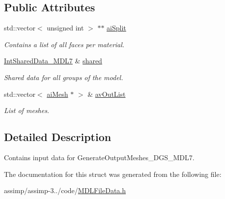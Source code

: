 \subsection*{Public Attributes}
\begin{DoxyCompactItemize}
\item 
\hypertarget{struct_assimp_1_1_m_d_l_1_1_int_split_group_data___m_d_l7_a9ffb10d3870a5d7408885b1e9b310814}{std\+::vector$<$ unsigned int $>$ $\ast$$\ast$ \hyperlink{struct_assimp_1_1_m_d_l_1_1_int_split_group_data___m_d_l7_a9ffb10d3870a5d7408885b1e9b310814}{ai\+Split}}\label{struct_assimp_1_1_m_d_l_1_1_int_split_group_data___m_d_l7_a9ffb10d3870a5d7408885b1e9b310814}

\begin{DoxyCompactList}\small\item\em Contains a list of all faces per material. \end{DoxyCompactList}\item 
\hypertarget{struct_assimp_1_1_m_d_l_1_1_int_split_group_data___m_d_l7_a4b0fd7c1a2246526ec255f5254c868e1}{\hyperlink{struct_assimp_1_1_m_d_l_1_1_int_shared_data___m_d_l7}{Int\+Shared\+Data\+\_\+\+M\+D\+L7} \& \hyperlink{struct_assimp_1_1_m_d_l_1_1_int_split_group_data___m_d_l7_a4b0fd7c1a2246526ec255f5254c868e1}{shared}}\label{struct_assimp_1_1_m_d_l_1_1_int_split_group_data___m_d_l7_a4b0fd7c1a2246526ec255f5254c868e1}

\begin{DoxyCompactList}\small\item\em Shared data for all groups of the model. \end{DoxyCompactList}\item 
\hypertarget{struct_assimp_1_1_m_d_l_1_1_int_split_group_data___m_d_l7_a724f4f4f679f6e9babe98142a6a06dcb}{std\+::vector$<$ \hyperlink{structai_mesh}{ai\+Mesh} $\ast$ $>$ \& \hyperlink{struct_assimp_1_1_m_d_l_1_1_int_split_group_data___m_d_l7_a724f4f4f679f6e9babe98142a6a06dcb}{av\+Out\+List}}\label{struct_assimp_1_1_m_d_l_1_1_int_split_group_data___m_d_l7_a724f4f4f679f6e9babe98142a6a06dcb}

\begin{DoxyCompactList}\small\item\em List of meshes. \end{DoxyCompactList}\end{DoxyCompactItemize}


\subsection{Detailed Description}
Contains input data for Generate\+Output\+Meshes\+\_\+D\+G\+S\+\_\+\+M\+D\+L7. 

The documentation for this struct was generated from the following file\+:\begin{DoxyCompactItemize}
\item 
assimp/assimp-\/3../code/\hyperlink{_m_d_l_file_data_8h}{M\+D\+L\+File\+Data.\+h}\end{DoxyCompactItemize}

